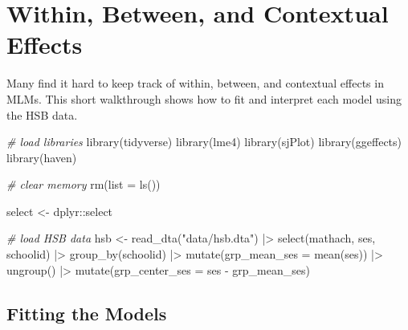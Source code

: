 \documentclass[
  letterpaper,
  DIV=11,
  numbers=noendperiod]{scrreprt}
\newenvironment{Shaded}{}{}
\newcommand{\AttributeTok}[1]{\textcolor[rgb]{0.49,0.56,0.16}{#1}}
\newcommand{\CommentTok}[1]{\textcolor[rgb]{0.38,0.63,0.69}{\textit{#1}}}
\newcommand{\FunctionTok}[1]{\textcolor[rgb]{0.02,0.16,0.49}{#1}}
\newcommand{\NormalTok}[1]{#1}
\newcommand{\OtherTok}[1]{\textcolor[rgb]{0.00,0.44,0.13}{#1}}
\newcommand{\SpecialCharTok}[1]{\textcolor[rgb]{0.25,0.44,0.63}{#1}}
\newcommand{\StringTok}[1]{\textcolor[rgb]{0.25,0.44,0.63}{#1}}
\begin{document}
\chapter{Within, Between, and Contextual
Effects}\label{within-between-and-contextual-effects}

Many find it hard to keep track of within, between, and contextual
effects in MLMs. This short walkthrough shows how to fit and interpret
each model using the HSB data.

\begin{Shaded}
\begin{Highlighting}[]
\CommentTok{\# load libraries}
\FunctionTok{library}\NormalTok{(tidyverse)}
\FunctionTok{library}\NormalTok{(lme4)}
\FunctionTok{library}\NormalTok{(sjPlot)}
\FunctionTok{library}\NormalTok{(ggeffects)}
\FunctionTok{library}\NormalTok{(haven)}

\CommentTok{\# clear memory}
\FunctionTok{rm}\NormalTok{(}\AttributeTok{list =} \FunctionTok{ls}\NormalTok{())}

\NormalTok{select }\OtherTok{\textless{}{-}}\NormalTok{ dplyr}\SpecialCharTok{::}\NormalTok{select}

\CommentTok{\# load HSB data}
\NormalTok{hsb }\OtherTok{\textless{}{-}} \FunctionTok{read\_dta}\NormalTok{(}\StringTok{"data/hsb.dta"}\NormalTok{) }\SpecialCharTok{|\textgreater{}} 
  \FunctionTok{select}\NormalTok{(mathach, ses, schoolid) }\SpecialCharTok{|\textgreater{}} 
  \FunctionTok{group\_by}\NormalTok{(schoolid) }\SpecialCharTok{|\textgreater{}} 
  \FunctionTok{mutate}\NormalTok{(}\AttributeTok{grp\_mean\_ses =} \FunctionTok{mean}\NormalTok{(ses)) }\SpecialCharTok{|\textgreater{}} 
  \FunctionTok{ungroup}\NormalTok{() }\SpecialCharTok{|\textgreater{}} 
  \FunctionTok{mutate}\NormalTok{(}\AttributeTok{grp\_center\_ses =}\NormalTok{ ses }\SpecialCharTok{{-}}\NormalTok{ grp\_mean\_ses)}
\end{Highlighting}
\end{Shaded}

\section{Fitting the Models}\label{fitting-the-models}
\end{document}
